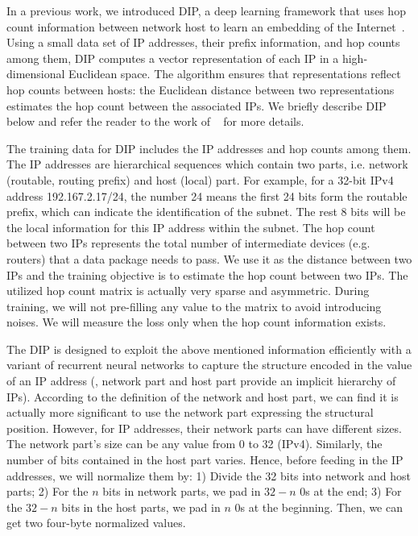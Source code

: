 In a previous work, we introduced DIP, a deep learning framework that uses hop count information between network host to learn an embedding of the Internet~\citep{dip}. Using a small data set of IP addresses, their prefix information, and hop counts among them, DIP computes a vector representation of each IP in a high-dimensional Euclidean space. The algorithm ensures that representations reflect hop counts between hosts: the Euclidean distance between two representations estimates the hop count between the associated IPs. We briefly describe DIP below and refer the reader to the work of ~\citet{dip, dip-ccr} for more details.


The training data for DIP includes the IP addresses and hop counts among them. The IP addresses are hierarchical sequences which contain two parts, i.e. network (routable, routing prefix) and host (local) part. For example, for a 32-bit IPv4 address 192.167.2.17/24, the number 24 means the first 24 bits form the routable prefix, which can indicate the identification of the subnet. The rest 8 bits will be the local information for this IP address within the subnet. The hop count between two IPs represents the total number of intermediate devices (e.g. routers) that a data package needs to pass. We use it as the distance between two IPs and the training objective is to estimate the hop count between two IPs. The utilized hop count matrix is actually very sparse and asymmetric. During training, we will not pre-filling any value to the matrix to avoid introducing noises. We will  measure the loss only when the hop count information exists. 

The DIP is designed to exploit the above mentioned information efficiently with a variant of recurrent neural networks to capture the structure encoded in the value of an IP address (\ie{}, network part and host part provide an implicit hierarchy of IPs). According to the definition of the network and host part, we can find it is actually more significant to use the network part expressing the structural position. However, for IP addresses, their network parts can have different sizes. The network part's size can be any value from 0 to 32 (IPv4).  Similarly, the number of bits contained in the host part varies. Hence, before feeding in the IP addresses, we will normalize them by: 1) Divide the 32 bits into network and host parts; 2) For the $n$ bits in network parts, we pad in $32-n$ 0s at the end; 3) For the $32-n$ bits in the host parts, we pad in $n$ 0s at the beginning. Then, we can get two four-byte normalized values.  

